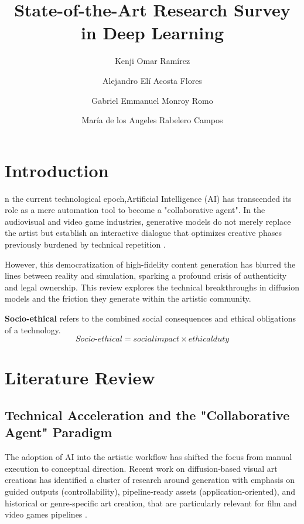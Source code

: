\documentclass[9pt,a4paper,twocolumn,twoside]{rho-class/rho}
\title{State-of-the-Art Research Survey in Deep Learning}
\author[{\textasteriskcentered}1]{Kenji Omar Ramírez}
\author[{\textdagger}1]{Alejandro Elí Acosta Flores}
\author[{\textdagger}1]{Gabriel Emmanuel Monroy Romo}
\author[{\textdagger}1]{María de los Angeles Rabelero Campos}
\affil[1]{Master in Applied Artificial Intelligence, Instituto Tecnologico y de Estudios Superiores de Monterrey}
\begin{document}
    \maketitle
    \thispagestyle{firststyle}


\section{Introduction}

    n the current technological epoch,Artificial Intelligence (AI) has transcended its role as a mere automation tool to become a "collaborative agent". In the audiovisual and video game industries, generative models do not merely replace the artist but establish an interactive dialogue that optimizes creative phases previously burdened by technical repetition \cite{calderon}. 

    However, this democratization of high-fidelity content generation has blurred the lines between reality and simulation, sparking a profound crisis of authenticity and legal ownership. This review explores the technical breakthroughs in diffusion models and the   friction they generate within the artistic community.

     \begin{note}
            \textbf{Socio‑ethical} refers to the combined social consequences and ethical obligations of a technology. 
            \begin{equation}\label{eq:equation}
                    Socio‑ethical = social impact × ethical duty
            \end{equation}
    \end{note}

\section{Literature Review}

    \subsection{Technical Acceleration and the "Collaborative Agent" Paradigm}

        The adoption of AI into the artistic workflow has shifted the focus from manual execution to conceptual direction. Recent work on diffusion‑based visual art creations has identified a cluster of research around generation with emphasis on guided outputs (controllability), pipeline‑ready assets (application‑oriented), and historical or genre-specific art creation, that are particularly relevant for film and video games pipelines \cite{wang}.
\end{document}
